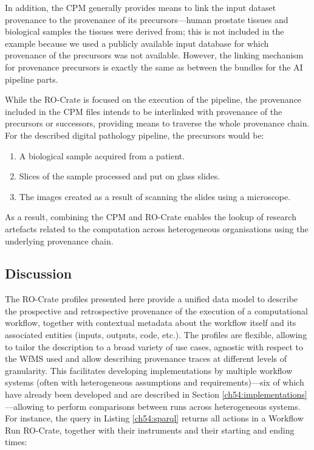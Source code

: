 In addition, the CPM generally provides means to link the input dataset provenance to the provenance of its precursors---human prostate tissues and biological samples the tissues were derived from; this is not included in the example because we used a publicly available input database for which provenance of the precursors was not available.
However, the linking mechanism for provenance precursors is exactly the same as between the bundles for the AI pipeline parts.

While the RO-Crate is focused on the execution of the pipeline, the provenance included in the CPM files intends to be interlinked with provenance of the precursors or successors, providing means to traverse the whole provenance chain.
For the described digital pathology pipeline, the precursors would be: 

\begin{enumerate}[(1)]
  \item A biological sample acquired from a patient.
  \item Slices of the sample processed and put on glass slides.
  \item The images created as a result of scanning the slides using a microscope.
\end{enumerate}

As a result, combining the CPM and RO-Crate enables the lookup of research artefacts related to the computation across heterogeneous organisations using the underlying provenance chain.


%
\subsection{Discussion}\label{ch54:discussion}


The RO-Crate profiles presented here provide a unified data model to describe the prospective and retrospective provenance of the execution of a computational workflow, together with contextual metadata about the workflow itself and its associated entities (inputs, outputs, code, etc.). 
The profiles are flexible, allowing to tailor the description to a broad variety of use cases, agnostic with respect to the WfMS used and allow describing provenance traces at different levels of granularity. 
This facilitates developing implementations by multiple workflow systems (often with heterogeneous assumptions and requirements)---six of which have already been developed and are described in Section \vref{ch54:implementations}---allowing to perform comparisons between runs across heterogeneous systems.
For instance, the  query in Listing \vref{ch54:sparql} returns all actions in a Workflow Run RO-Crate, together with their instruments and their starting and ending times:

